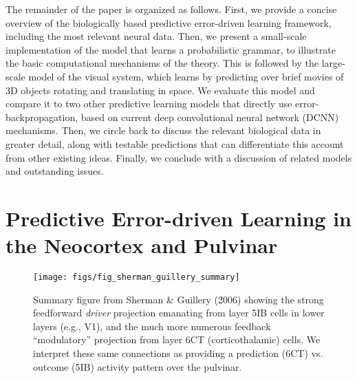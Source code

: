 \documentclass[11pt,twoside]{article}
\newif\myifpdf
\begin{document}
The remainder of the paper is organized as follows.  First, we provide a concise overview of the biologically based predictive error-driven learning framework, including the most relevant neural data.  Then, we present a small-scale implementation of the model that learns a probabilistic grammar, to illustrate the basic computational mechanisms of the theory.  This is followed by the large-scale model of the visual system, which learns by predicting over brief movies of 3D objects rotating and translating in space.  We evaluate this model and compare it to two other predictive learning models that directly use error-backpropagation, based on current deep convolutional neural network (DCNN) mechanisms.  Then, we circle back to discuss the relevant biological data in greater detail, along with testable predictions that can differentiate this account from other existing ideas.  Finally, we conclude with a discussion of related models and outstanding issues.

\section{Predictive Error-driven Learning in the Neocortex and Pulvinar}

\begin{figure}
  \centering\texttt{[image: figs/fig\_sherman\_guillery\_summary]}
  \caption{\footnotesize Summary figure from Sherman \& Guillery (2006) showing the strong feedforward \emph{driver} projection emanating from layer 5IB cells in lower layers (e.g., V1), and the much more numerous feedback ``modulatory'' projection from layer 6CT (corticothalamic) cells.  We interpret these same connections as providing a prediction (6CT) vs. outcome (5IB) activity pattern over the pulvinar.}
  \label{fig.sg06}
\end{figure}
\end{document}
